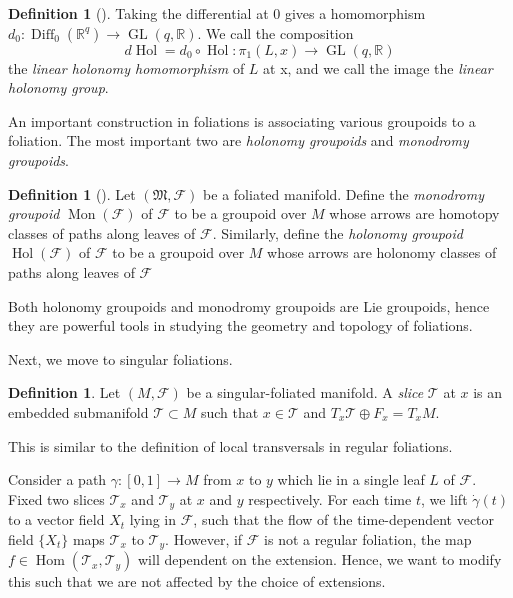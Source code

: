 \documentclass[12pt]{amsart}
\theoremstyle{definition}
\newtheorem{defn}[thm]{Definition}
\theoremstyle{remark}
\numberwithin{equation}{section}
\newcommand{\CF}{{\mathcal F}}
\newcommand{\R}{{\mathbb{R}}}
\newcommand{\1}{{\mathbb{1}}}
\newcommand{\Diff}{\operatorname{Diff}}
\newcommand{\GL}{\operatorname{GL}}
\newcommand{\M}{{\mathfrak{M}}}
\newcommand{\Hom}{\operatorname{Hom}}
\newcommand{\mon}{\operatorname{Mon}}
\newcommand{\hol}{\operatorname{Hol}}
\begin{document}
\begin{defn}[\cite{MM03}]
    Taking the differential at 0 gives a homomorphism $d_0:  \Diff_0(\R^q) \to \GL(q, \R)$. We call the composition 
    \begin{equation*}
        d\hol = d_0\circ \hol: \pi_1(L,x) \to \GL(q,\R)
    \end{equation*}
    the {\it linear holonomy homomorphism} of $L$ at x, and we call the image the {\it linear holonomy group}.
\end{defn}
An important construction in foliations is associating various groupoids to a foliation. The most important two are {\it holonomy groupoids} and {\it monodromy groupoids}.
\begin{defn}[\cite{MM03}]
    Let $(\M, \CF)$ be a foliated manifold. Define the {\it monodromy groupoid} $\mon(\CF)$ of $\CF$ to be a groupoid over $M$ whose arrows are homotopy classes of paths along leaves of $\CF$. Similarly, define the {\it holonomy groupoid} $\hol(\CF)$ of $\CF$ to be a groupoid over $M$ whose arrows are holonomy classes of paths along leaves of $\CF$
\end{defn}
Both holonomy groupoids and monodromy groupoids are Lie groupoids, hence they are powerful tools in studying the geometry and topology of foliations.

Next, we move to singular foliations.
\begin{defn}
    Let $(M, \CF)$ be a singular-foliated manifold. A {\it slice} $\mathcal{T}$ at $x$ is an embedded submanifold $\mathcal{T}\subset M$ such that $x\in \mathcal{T}$ and $T_x \mathcal{T}\oplus F_x = T_x M$.
\end{defn}
This is similar to the definition of local transversals in regular foliations.


Consider a path $\gamma:[0,1]\to M$ from $x$ to $y$ which lie in a single leaf $L$ of $\CF$. Fixed two slices $\mathcal{T}_x$ and $\mathcal{T}_y$ at $x$ and $y$ respectively. For each time $t$, we lift $\dot{\gamma}(t)$ to a vector field $X_t$ lying in $\CF$, such that the flow of the time-dependent vector field $\{X_t\}$ maps $\mathcal{T}_x$ to $\mathcal{T}_y$. However, if $\CF$ is not a regular foliation, the map $f\in \Hom(\mathcal{T}_x, \mathcal{T}_y)$ will dependent on the extension. Hence, we want to modify this such that we are not affected by the choice of extensions.
\end{document}
